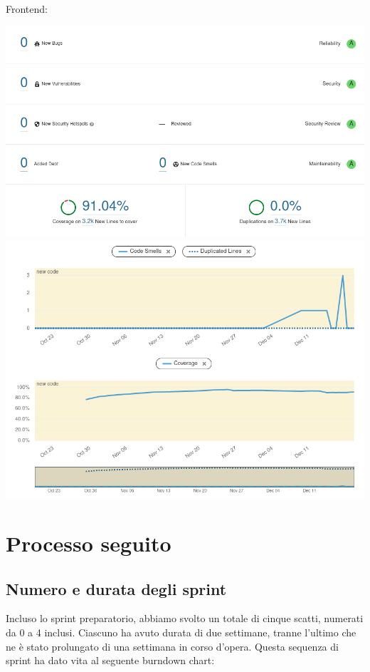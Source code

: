 \documentclass{article}
\begin{document}
Frontend:

\includegraphics[width=\textwidth]{quality-frontend-overall.png}
\includegraphics[width=\textwidth]{quality-frontend-activity.png}

\section{Processo seguito}

\subsection{Numero e durata degli sprint}

Incluso lo sprint preparatorio, abbiamo svolto un totale di cinque scatti,
numerati da 0 a 4 inclusi. Ciascuno ha avuto durata di due settimane, tranne
l'ultimo che ne è stato prolungato di una settimana in corso d'opera. Questa
sequenza di sprint ha dato vita al seguente burndown chart:
\end{document}
